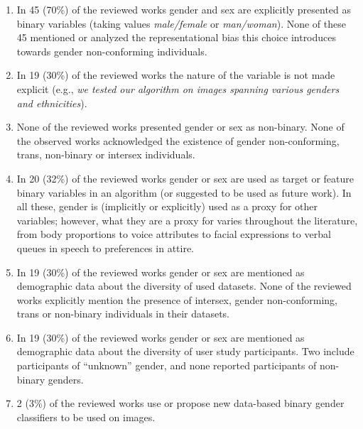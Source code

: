 \documentclass[nonacm,sigconf,review,balance=false]{acmart}
\begin{document}
\begin{enumerate}[O1.]
    \item In 45 (70\%) of the reviewed works gender and sex are explicitly presented as binary variables (taking values \emph{male/female} or \emph{man/woman}). None of these 45 mentioned or analyzed the representational bias this choice introduces towards gender non-conforming individuals.
    \item In 19 (30\%) of the reviewed works the nature of the variable is not made explicit (e.g., \emph{we tested our algorithm on images spanning various genders and ethnicities}).
    \item None of the reviewed works presented gender or sex as non-binary. None of the observed works acknowledged the existence of gender non-conforming, trans, non-binary or intersex individuals.
    \item In 20 (32\%) of the reviewed works gender or sex are used as target or feature binary variables in an algorithm (or suggested to be used as future work). In all these, gender is (implicitly or explicitly) used as a proxy for other variables; however, what they are a proxy for varies throughout the literature, from body proportions to voice attributes to facial expressions to verbal queues in speech to preferences in attire.
    \item In 19 (30\%) of the reviewed works gender or sex are mentioned as demographic data about the diversity of used datasets. None of the reviewed works explicitly mention the presence of intersex, gender non-conforming, trans or non-binary individuals in their datasets.
    \item In 19 (30\%) of the reviewed works gender or sex are mentioned as demographic data about the diversity of user study participants. Two include participants of ``unknown'' gender, and none reported participants of non-binary genders.
    \item 2 (3\%) of the reviewed works use or propose new data-based binary gender classifiers to be used on images.
\end{enumerate}
\end{document}
